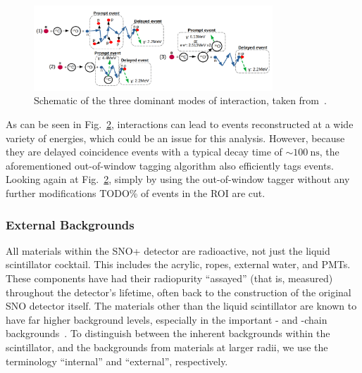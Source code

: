 \begin{figure}
    \centering
    \includegraphics[width=0.8\textwidth]{6_SolarAnalysis/images/alpha_n_schematic_Iwan_modified.pdf}
    \caption[Schematic of \alphan{} interactions.]{Schematic of the three dominant modes of \alphan{} interaction, taken from~\cite{morton-blakeFirstMeasurementReactor2021}. %
    }
    \label{fig:alpha_n_drawing}
\end{figure}

As can be seen in Fig.~\ref{fig:alpha_n_coincidence_cut_impact}, \alphan{} interactions can lead to events reconstructed at a wide variety of energies, which could be an issue for this analysis. However, because they are delayed coincidence events with a typical decay time of $\sim\SI{100}{\nano\second}$, the aforementioned out-of-window  tagging algorithm also efficiently tags \alphan{} events. Looking again at Fig.~\ref{fig:alpha_n_coincidence_cut_impact}, simply by using the out-of-window  tagger without any further modifications TODO\% of events in the ROI are cut.

\begin{figure}
    \centering
    \caption[]{}
    \label{fig:alpha_n_coincidence_cut_impact}
\end{figure}


\subsubsection{External Backgrounds}
All materials within the SNO+ detector are radioactive, not just the liquid scintillator cocktail. This includes the acrylic, ropes, external water, and PMTs. These components have had their radiopurity ``assayed'' (that is, measured) throughout the detector's lifetime, often back to the construction of the original SNO detector itself. The materials other than the liquid scintillator are known to have far higher background levels, especially in the important - and -chain backgrounds~\cite{andringaCurrentStatusFuture2016}. %
To distinguish between the inherent backgrounds within the scintillator, and the backgrounds from materials at larger radii, we use the terminology ``internal'' and ``external'', respectively.

